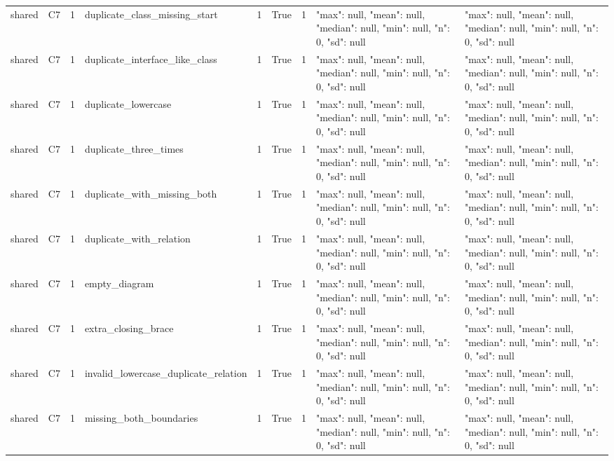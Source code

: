\begin{tabular}{lllllllll}
shared & C7 & 1 & duplicate\_class\_missing\_start & 1 & True & 1 & {"max": null, "mean": null, "median": null, "min": null, "n": 0, "sd": null} & {"max": null, "mean": null, "median": null, "min": null, "n": 0, "sd": null} \\
shared & C7 & 1 & duplicate\_interface\_like\_class & 1 & True & 1 & {"max": null, "mean": null, "median": null, "min": null, "n": 0, "sd": null} & {"max": null, "mean": null, "median": null, "min": null, "n": 0, "sd": null} \\
shared & C7 & 1 & duplicate\_lowercase & 1 & True & 1 & {"max": null, "mean": null, "median": null, "min": null, "n": 0, "sd": null} & {"max": null, "mean": null, "median": null, "min": null, "n": 0, "sd": null} \\
shared & C7 & 1 & duplicate\_three\_times & 1 & True & 1 & {"max": null, "mean": null, "median": null, "min": null, "n": 0, "sd": null} & {"max": null, "mean": null, "median": null, "min": null, "n": 0, "sd": null} \\
shared & C7 & 1 & duplicate\_with\_missing\_both & 1 & True & 1 & {"max": null, "mean": null, "median": null, "min": null, "n": 0, "sd": null} & {"max": null, "mean": null, "median": null, "min": null, "n": 0, "sd": null} \\
shared & C7 & 1 & duplicate\_with\_relation & 1 & True & 1 & {"max": null, "mean": null, "median": null, "min": null, "n": 0, "sd": null} & {"max": null, "mean": null, "median": null, "min": null, "n": 0, "sd": null} \\
shared & C7 & 1 & empty\_diagram & 1 & True & 1 & {"max": null, "mean": null, "median": null, "min": null, "n": 0, "sd": null} & {"max": null, "mean": null, "median": null, "min": null, "n": 0, "sd": null} \\
shared & C7 & 1 & extra\_closing\_brace & 1 & True & 1 & {"max": null, "mean": null, "median": null, "min": null, "n": 0, "sd": null} & {"max": null, "mean": null, "median": null, "min": null, "n": 0, "sd": null} \\
shared & C7 & 1 & invalid\_lowercase\_duplicate\_relation & 1 & True & 1 & {"max": null, "mean": null, "median": null, "min": null, "n": 0, "sd": null} & {"max": null, "mean": null, "median": null, "min": null, "n": 0, "sd": null} \\
shared & C7 & 1 & missing\_both\_boundaries & 1 & True & 1 & {"max": null, "mean": null, "median": null, "min": null, "n": 0, "sd": null} & {"max": null, "mean": null, "median": null, "min": null, "n": 0, "sd": null} \\

\end{tabular}
